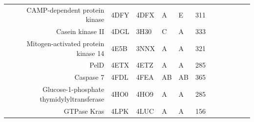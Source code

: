 \begin{table}
\begin{scriptsize}
\begin{tabular}{rrrrrrrrrrrr}
\multicolumn{1}{r}{CAMP-dependent protein kinase} & \multicolumn{1}{l}{4DFY} & \multicolumn{1}{l}{4DFX} & \multicolumn{1}{l}{A} & \multicolumn{1}{l}{E} & 311   & \cellcolor[rgb]{ .573,  .816,  .314}  & \cellcolor[rgb]{ .573,  .816,  .314}  & \cellcolor[rgb]{ 1,  .494,  .475}  & \cellcolor[rgb]{ 1,  .494,  .475}  & \cellcolor[rgb]{ .573,  .816,  .314}  & \cellcolor[rgb]{ .573,  .816,  .314}  \\
\multicolumn{1}{r}{Casein kinase II} & \multicolumn{1}{l}{4DGL} & \multicolumn{1}{l}{3H30} & \multicolumn{1}{l}{C} & \multicolumn{1}{l}{A} & 333   & \cellcolor[rgb]{ .573,  .816,  .314}  & \cellcolor[rgb]{ 1,  .494,  .475}  & \cellcolor[rgb]{ 1,  .494,  .475}  & \cellcolor[rgb]{ .573,  .816,  .314}  & \cellcolor[rgb]{ 1,  .494,  .475}  & \cellcolor[rgb]{ .573,  .816,  .314}  \\
\multicolumn{1}{r}{Mitogen-activated protein kinase 14} & \multicolumn{1}{l}{4E5B} & \multicolumn{1}{l}{3NNX} & \multicolumn{1}{l}{A} & \multicolumn{1}{l}{A} & 321   & \cellcolor[rgb]{ .573,  .816,  .314}  & \cellcolor[rgb]{ 1,  .494,  .475}  & \cellcolor[rgb]{ 1,  .494,  .475}  & \cellcolor[rgb]{ .573,  .816,  .314}  & \cellcolor[rgb]{ .573,  .816,  .314}  & \cellcolor[rgb]{ .573,  .816,  .314}  \\
\multicolumn{1}{r}{PelD} & \multicolumn{1}{l}{4ETX} & \multicolumn{1}{l}{4ETZ} & \multicolumn{1}{l}{A} & \multicolumn{1}{l}{A} & 285   & \cellcolor[rgb]{ 1,  .494,  .475}  & \cellcolor[rgb]{ 1,  .494,  .475}  & \cellcolor[rgb]{ .573,  .816,  .314}  & \cellcolor[rgb]{ 1,  .494,  .475}  & \cellcolor[rgb]{ 1,  .494,  .475}  & \cellcolor[rgb]{ 1,  .494,  .475}  \\
\multicolumn{1}{r}{Caspase 7} & \multicolumn{1}{l}{4FDL} & \multicolumn{1}{l}{4FEA} & \multicolumn{1}{l}{AB} & \multicolumn{1}{l}{AB} & 365   & \cellcolor[rgb]{ 1,  .494,  .475}  & \cellcolor[rgb]{ .573,  .816,  .314}  & \cellcolor[rgb]{ .573,  .816,  .314}  & \cellcolor[rgb]{ 1,  .494,  .475}  & \cellcolor[rgb]{ .573,  .816,  .314}  & \cellcolor[rgb]{ 1,  .494,  .475}  \\
\multicolumn{1}{r}{Glucose-1-phosphate thymidylyltransferase} & \multicolumn{1}{l}{4HO0} & \multicolumn{1}{l}{4HO9} & \multicolumn{1}{l}{A} & \multicolumn{1}{l}{A} & 285   & \cellcolor[rgb]{ .573,  .816,  .314}  & \cellcolor[rgb]{ .573,  .816,  .314}  & \cellcolor[rgb]{ 1,  .494,  .475}  & \cellcolor[rgb]{ 1,  .494,  .475}  & \cellcolor[rgb]{ .573,  .816,  .314}  & \cellcolor[rgb]{ 1,  .494,  .475}  \\
\multicolumn{1}{r}{GTPase Kras} & \multicolumn{1}{l}{4LPK} & \multicolumn{1}{l}{4LUC} & \multicolumn{1}{l}{A} & \multicolumn{1}{l}{A} & 156   & \cellcolor[rgb]{ .573,  .816,  .314}  & \cellcolor[rgb]{ .573,  .816,  .314}  & \cellcolor[rgb]{ 1,  1,  0}  & \cellcolor[rgb]{ .573,  .816,  .314}  & \cellcolor[rgb]{ .573,  .816,  .314}  & \cellcolor[rgb]{ .573,  .816,  .314}  \\

\end{tabular}
\end{scriptsize}
\end{table}
